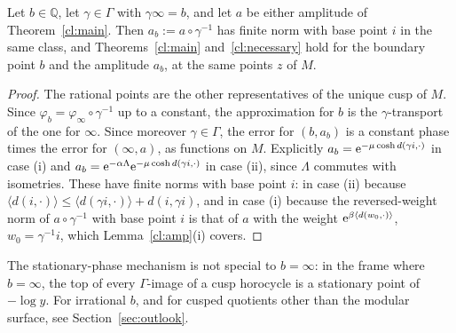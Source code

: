 \begin{corollary}\label{cl:rational}
Let $b\in\mathbb Q$, let $\gamma\in\Gamma$ with $\gamma\infty=b$, and let $a$ be either amplitude of Theorem~\ref{cl:main}. Then
$a_b:=a\circ\gamma^{-1}$ has finite norm with base point $i$ in the same class, and Theorems~\ref{cl:main} and~\ref{cl:necessary}
hold for the boundary point $b$ and the amplitude $a_b$, at the same points $z$ of $M$.
\end{corollary}
\begin{proof}
The rational points are the other representatives of the unique cusp of $M$. Since $\varphi_b=\varphi_\infty\circ\gamma^{-1}$ up to a
constant, the approximation for $b$ is the $\gamma$-transport of the one for $\infty$. Since moreover $\gamma\in\Gamma$, the error for
$(b,a_b)$ is a constant phase times the error for $(\infty,a)$, as functions on $M$. Explicitly $a_b=\mathrm{e}^{-\mu\cosh d(\gamma i,\cdot)}$ in case (i) and
$a_b=\mathrm{e}^{-\alpha\Lambda}\mathrm{e}^{-\mu\cosh d(\gamma i,\cdot)}$ in case (ii), since $\Lambda$ commutes with isometries. These have finite norms
with base point $i$: in case (ii) because $\langle d(i,\cdot)\rangle\le\langle d(\gamma i,\cdot)\rangle+d(i,\gamma i)$, and in case (i) because the
reversed-weight norm of $a\circ\gamma^{-1}$ with base point $i$ is that of $a$ with the weight $\mathrm{e}^{\beta\langle d(w_0,\cdot)\rangle}$, $w_0=\gamma^{-1}i$, which
Lemma~\ref{cl:amp}(i) covers.
\end{proof}

The stationary-phase mechanism is not special to $b=\infty$: in the frame where $b=\infty$, the top of every $\Gamma$-image of a cusp
horocycle is a stationary point of $-\log y$. For irrational $b$, and for cusped quotients other than the modular surface, see
Section~\ref{sec:outlook}.
